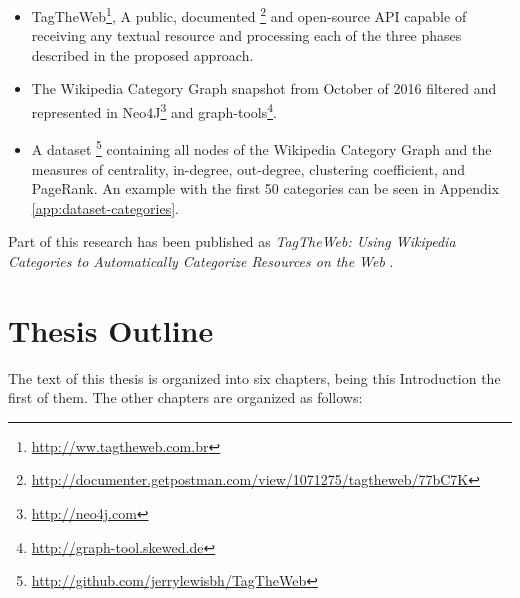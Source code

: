 \begin{itemize}
\item TagTheWeb\footnote{\url{http://ww.tagtheweb.com.br}}, A public, documented \footnote{\url{http://documenter.getpostman.com/view/1071275/tagtheweb/77bC7K}} and open-source API capable of receiving any textual resource and processing each of the three phases described in the proposed approach.

\item  The Wikipedia Category Graph snapshot from October of 2016 filtered and represented in Neo4J\footnote{\url{http://neo4j.com}} and graph-tools\footnote{\url{http://graph-tool.skewed.de}}.  

\item A dataset \footnote {\url{http://github.com/jerrylewisbh/TagTheWeb}} containing all nodes of the Wikipedia Category Graph and the measures of centrality, in-degree, out-degree, clustering coefficient, and PageRank. An example with the first 50 categories can be seen in Appendix \ref{app:dataset-categories}.

\end{itemize}
Part of this research has been published as \textit{TagTheWeb: Using Wikipedia Categories to Automatically Categorize Resources on the Web} \cite{medeiros2018tagtheweb}.

\section{\hspace*{3pt}Thesis Outline}

The text of this thesis is organized into six chapters, being this Introduction the first of them. The other chapters are organized as follows:

